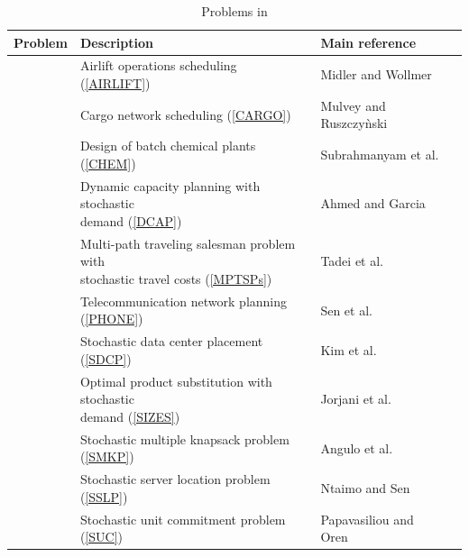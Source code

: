 \begin{table}[H]
	\centering
			\caption{Problems in \siplibtwo}
			\label{table:problems}
			\begin{tabular}{@{}llll@{}}
				\toprule
				Problem		  		  & Description                                                        & Main reference              \\ \midrule
				\airlift\ & Airlift operations scheduling (\ref{AIRLIFT}) & Midler and Wollmer \cite{journal:MW1969} \\
				\cargo\ & Cargo network scheduling (\ref{CARGO}) & Mulvey and Ruszczy\`{n}ski \cite{journal:MR1995}\\
				\chem\ & Design of batch chemical plants (\ref{CHEM}) & Subrahmanyam et al. \cite{journal:SPR1994}\\				
				\dcap\         & \makecell[tl]{Dynamic capacity planning with stochastic\\ demand (\ref{DCAP}) }                  & Ahmed and Garcia \cite{journal:AG2004}                          \\
				\mptsps\       & \makecell[tl]{Multi-path traveling salesman problem with\\ stochastic travel costs (\ref{MPTSPs})}& Tadei et al. \cite{journal:TPP2017}                            \\
				\phone\       & Telecommunication network planning (\ref{PHONE})& Sen et al. \cite{journal:SDC1994}                            \\
				\sdcp\ 	& Stochastic data center placement (\ref{SDCP}) & Kim et al. \cite{journal:KYZC2017}\\
				\sizes\        & \makecell[tl]{Optimal product substitution with stochastic\\ demand (\ref{SIZES})}         & Jorjani et al. \cite{journal:JSW1999}          \\
				\smkp\		  & Stochastic multiple knapsack problem (\ref{SMKP})                              & Angulo et al. \cite{journal:AAD2014}                            \\
				\sslp\         & Stochastic server location problem (\ref{SSLP})                                & Ntaimo and Sen \cite{journal:NS2005}                           \\
				\suc\         & Stochastic unit commitment problem	(\ref{SUC})			               & Papavasiliou and Oren \cite{journal:PO2013}                       \\ \bottomrule
			\end{tabular}%
			
\end{table}

